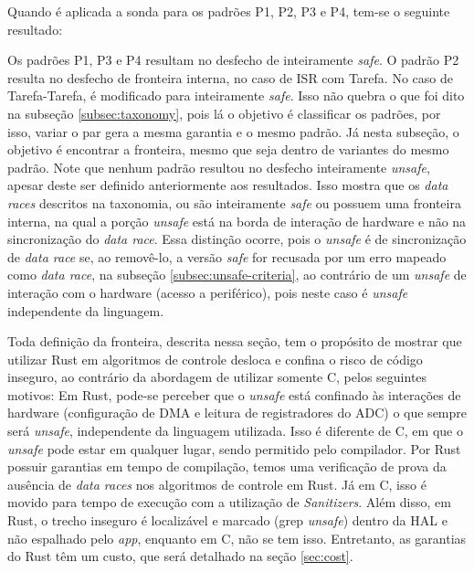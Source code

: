 
Quando é aplicada a sonda para os padrões P1, P2, P3 e P4, tem-se o seguinte resultado:


Os padrões P1, P3 e P4 resultam no desfecho de inteiramente \textit{safe}. O padrão P2 resulta no desfecho de fronteira interna, no caso de \ac{ISR} com Tarefa. No caso de Tarefa-Tarefa, é modificado para inteiramente \textit{safe}. Isso não quebra o que foi dito na subseção \ref{subsec:taxonomy}, pois lá o objetivo é classificar os padrões, por isso, variar o par gera a mesma garantia e o mesmo padrão. Já nesta subseção, o objetivo é encontrar a fronteira, mesmo que seja dentro de variantes do mesmo padrão. Note que nenhum padrão resultou no desfecho inteiramente \textit{unsafe}, apesar deste ser definido anteriormente aos resultados. Isso mostra que os \textit{data races} descritos na taxonomia, ou são inteiramente \textit{safe} ou possuem uma fronteira interna, na qual a porção \textit{unsafe} está na borda de interação de hardware e não na sincronização do \textit{data race}. Essa distinção ocorre, pois o \textit{unsafe} é de sincronização de \textit{data race} se, ao removê-lo, a versão \textit{safe} for recusada por um erro mapeado como \textit{data race}, na subseção \ref{subsec:unsafe-criteria}, ao contrário de um \textit{unsafe} de interação com o hardware (acesso a periférico), pois neste caso é \textit{unsafe} independente da linguagem.

Toda definição da fronteira, descrita nessa seção, tem o propósito de mostrar que utilizar Rust em algoritmos de controle desloca e confina o risco de código inseguro, ao contrário da abordagem de utilizar somente C, pelos seguintes motivos: Em Rust, pode-se perceber que o \textit{unsafe} está confinado às interações de hardware (configuração de \ac{DMA} e leitura de registradores do \ac{ADC}) o que sempre será \textit{unsafe}, independente da linguagem utilizada. Isso é diferente de C, em que o \textit{unsafe} pode estar em qualquer lugar, sendo permitido pelo compilador. Por Rust possuir garantias em tempo de compilação, temos uma verificação de prova da ausência de \textit{data races} nos algoritmos de controle em Rust. Já em C, isso é movido para tempo de execução com a utilização de \textit{Sanitizers}. Além disso, em Rust, o trecho inseguro é localizável e marcado (grep \textit{unsafe}) dentro da \ac{HAL} e não espalhado pelo \textit{app}, enquanto em C, não se tem isso. Entretanto, as garantias do Rust têm um custo, que será detalhado na seção \ref{sec:cost}.

